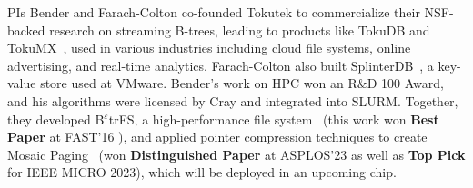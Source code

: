 PIs Bender and Farach-Colton co-founded Tokutek to commercialize their NSF-backed research on streaming B-trees, leading to products like TokuDB\cite{TokuDB} and TokuMX~\cite{TokuMX}, used in various industries including cloud file systems, online advertising, and real-time analytics. Farach-Colton also built SplinterDB~\cite{splinterdb, splinterdb2}, a key-value store used at VMware. Bender's work on HPC won an R\&D 100 Award, and his algorithms were licensed by Cray and integrated into SLURM. Together, they developed B$^\varepsilon$trFS, a high-performance file system~\cite{JannenYuZh15a,JannenYuZh15b,login2,YuanZhJa16,login1,DBLP:conf/fast/0001CJMGBFJJPY20,DBLP:conf/hotstorage/ConwayKJBJJPF19,DBLP:journals/tos/ZhanJPCKFBYJJ18,DBLP:conf/fast/ZhanCJKBFJJPY18,DBLP:journals/tos/YuanZJPACDKWBFJ17,DBLP:journals/usenix-login/ConwayBJ0BJJKPY17,DBLP:conf/fast/ConwayBJJZYBJKP17} (this work won \textbf{Best Paper} at FAST'16 \cite{YuanZhJa16}), and applied pointer compression techniques to create Mosaic Paging~\cite{mosaicasplos, mosaicspaa} (won \textbf{Distinguished Paper} at ASPLOS'23 as well as \textbf{Top Pick} for IEEE MICRO 2023), which will be deployed in an upcoming chip.

%

